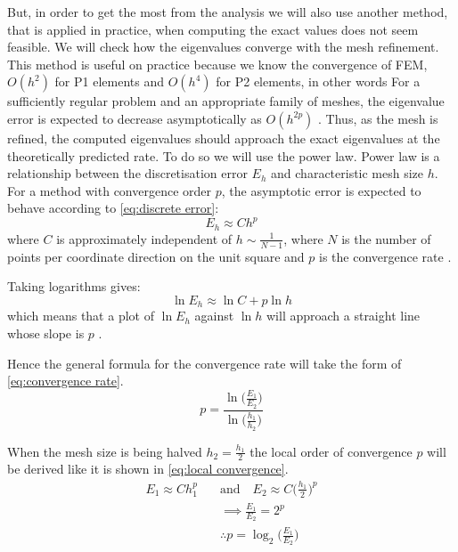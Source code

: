 \documentclass[acmsmall,screen]{MapleTrans}
\begin{document}
But, in order to get the most from the analysis we will also use another method, that is applied in practice, when computing the exact values does not seem feasible. We will check how the eigenvalues converge with the mesh refinement.
This method is useful on practice because we know the convergence of FEM, $O(h^2)$ for P1 elements and $O(h^4)$ for P2 elements, in other words For a sufficiently regular problem and an appropriate family of meshes, the eigenvalue error is expected to decrease asymptotically as $O(h^{2p})$ \cite{b12.4}. Thus, as the mesh is refined, the computed eigenvalues should approach the exact eigenvalues at the theoretically predicted rate.
To do so we will use the power law. Power law is a relationship between the discretisation error $E_h$ and characteristic mesh size $h$. For a method with convergence order $p$, the asymptotic error is expected to behave according to \eqref{eq:discrete error}:
\begin{equation}
    E_h \approx Ch^{p}
    \label{eq:discrete error}
\end{equation}
where $C$ is approximately independent of $h \sim \frac{1}{N - 1}$, where $N$ is the number of points per coordinate direction on the unit square and $p$ is the convergence rate \cite{b12.4}. 

Taking logarithms gives:
\begin{equation}
    \ln E_h \approx \ln C + p\ln h
\end{equation} 
which means that a plot of $\ln E_h$ against $\ln h$ will approach a straight line whose slope is $p$ \cite{b26}.

Hence the general formula for the convergence rate will take the form of \eqref{eq:convergence rate}.
\begin{equation}
    p = \frac{\ln\Big(\frac{E_1}{E_2}\Big)}{\ln\Big(\frac{h_1}{h_2}\Big)}
    \label{eq:convergence rate}
\end{equation}

When the mesh size is being halved $h_2 = \frac{h_1}{2}$ the local order of convergence $p$ will be derived like it is shown in \eqref{eq:local convergence}.
\begin{equation}
\begin{aligned}
    E_1 \approx Ch_1^p &\quad\text{and}\quad E_2 \approx C\Bigg(\frac{h_1}{2}\Bigg)^p \\
    &\quad \implies \frac{E_1}{E_2} = 2^p \\
    &\quad \therefore p = \log_2\Bigg(\frac{E_1}{E_2}\Bigg)
    \label{eq:local convergence}
\end{aligned}
\end{equation}
\end{document}

